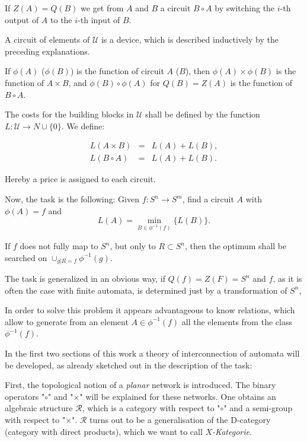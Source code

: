 \documentclass{article}
\begin{document}
If $Z(A) = Q(B)$ we get from $A$ and $B$ a circuit $B\circ A$ by switching the $i$-th output of $A$ to the $i$-th input of $B$.

A circuit of elements of $\mathcal{U}$ is a device, which is described inductively by the preceding explanations.

If $\phi(A)$ ($\phi(B)$) is the function of circuit $A$ ($B$), then $\phi(A)\times \phi(B)$ is the function of $A\times B$, and $\phi(B)\circ \phi(A)$ for $Q(B) = Z(A)$  is the function of $B\circ A$.

The costs for the building blocks in $\mathcal{U}$ shall be defined by the function $L : \mathcal{U} \rightarrow N \cup \{0\}$. We define:

\[
\begin{array}{lcr}
L(A\times B) & = & L(A) + L(B), \\
L(B\circ A) & = & L(A) + L(B).
\end{array}
\]

Hereby a price is assigned to each circuit.

Now, the task is the following: Given $f : S^n \rightarrow S^m$, find a circuit $A$ with $\phi(A) = f$ and
\[
L(A) = \min_{B \in \phi^{-1}(f)} \{ L(B) \}.
\]

If $f$ does not fully map to $S^n$, but only to $R \subset S^n$, then the optimum shall be searched on $\cup_{g|R=f} \phi^{-1}(g)$. 

The task is generalized in an obvious way, if $Q(f) = Z(F) = S^n$ and $f$, as it is often the case with finite automata, is determined just by a transformation of $S^n$, 

In order to solve this problem it appears advantageous to know relations, which allow to generate from an element $A \in \phi^{-1}(f)$ all the elements from the class $\phi^{-1}(f)$.

In the first two sections of this work a theory of interconnection of automata will be developed, as already sketched out in the description of the task:

First, the topological notion of a \emph{planar} network is introduced. The binary operators "$\circ$" and "$\times$" will be explained for these networks. One obtains an algebraic structure $\mathcal{R}$, which is a category with respect to "$\circ$" and a semi-group with respect to "$\times$". $\mathcal{R}$ turns out to be a generalisation of the D-category (category with direct products), which we want to call \emph{$X$-Kategorie}.
\end{document}
